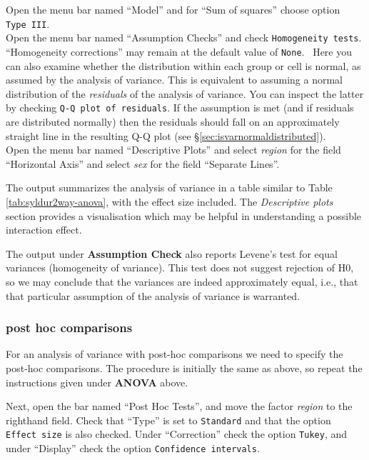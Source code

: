 \documentclass[
]{book}
\begin{document}
Open the menu bar named ``Model'' and for ``Sum of squares'' choose option \texttt{Type\ III}.\\
Open the menu bar named ``Assumption Checks'' and check \texttt{Homogeneity\ tests}.\\
``Homogeneity corrections'' may remain at the default value of \texttt{None}.~
Here you can also examine whether the distribution within each group or cell is normal, as assumed by the analysis of variance. This is equivalent to assuming a normal distribution of the \emph{residuals} of the analysis of variance. You can inspect the latter by checking \texttt{Q-Q\ plot\ of\ residuals}. If the assumption is met (and if residuals are distributed normally) then the residuals should fall on an approximately straight line in the resulting Q-Q plot (see §\ref{sec:isvarnormaldistributed}).\\
Open the menu bar named ``Descriptive Plots'' and select \emph{region} for the field ``Horizontal Axis'' and select \emph{sex} for the field ``Separate Lines''.

The output summarizes the analysis of variance in a table similar to Table \ref{tab:syldur2way-anova}, with the effect size included.
The \emph{Descriptive plots} section provides a visualisation which may be helpful in understanding a possible interaction effect.

The output under \textbf{Assumption Check} also reports Levene's test for equal variances (homogeneity of variance). This test does not suggest rejection of H0, so we may conclude that the variances are indeed approximately equal, i.e., that that particular assumption of the analysis of variance is warranted.

\hypertarget{post-hoc-comparisons-1}{%
\subsubsection{post hoc comparisons}\label{post-hoc-comparisons-1}}

For an analysis of variance with post-hoc comparisons we need to specify the post-hoc comparisons. The procedure is initially the same as above, so repeat the instructions given under \textbf{ANOVA} above.

Next, open the bar named ``Post Hoc Tests'', and move the factor \emph{region} to the righthand field.
Check that ``Type'' is set to \texttt{Standard} and that the option \texttt{Effect\ size} is also checked.
Under ``Correction'' check the option \texttt{Tukey}, and under ``Display'' check the option \texttt{Confidence\ intervals}.
\end{document}
